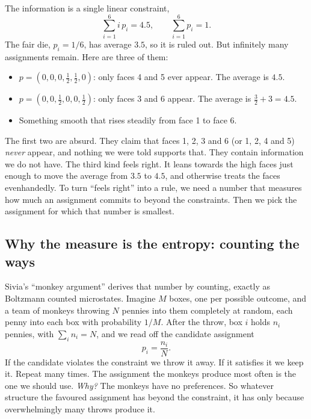 The information is a single linear constraint,
\begin{equation}
  \sum_{i=1}^{6} i\,p_i = 4.5 ,\qquad \sum_{i=1}^{6}p_i=1 .
  \label{2b:eq:die-constraint}
\end{equation}
The fair die, $p_i=1/6$, has average $3.5$, so it is ruled out. But infinitely many assignments remain. Here are three of them:
\begin{itemize}
  \item $p=(0,0,0,\tfrac12,\tfrac12,0)$: only faces 4 and 5 ever appear. The average is $4.5$.
  \item $p=(0,0,\tfrac12,0,0,\tfrac12)$: only faces 3 and 6 appear. The average is $\tfrac32+3=4.5$.
  \item Something smooth that rises steadily from face 1 to face 6.
\end{itemize}
The first two are absurd. They claim that faces 1, 2, 3 and 6 (or 1, 2, 4 and 5) \emph{never} appear, and nothing we were told supports that. They contain information we do not have. The third kind feels right. It leans towards the high faces just enough to move the average from $3.5$ to $4.5$, and otherwise treats the faces evenhandedly. To turn ``feels right'' into a rule, we need a number that measures how much an assignment commits to beyond the constraints. Then we pick the assignment for which that number is smallest.

\subsection{Why the measure is the entropy: counting the ways}
\label{2b:sec:monkeys}

Sivia's ``monkey argument''  derives that number by counting, exactly as Boltzmann counted microstates. Imagine $M$ boxes, one per possible outcome, and a team of monkeys throwing $N$ pennies into them completely at random, each penny into each box with probability $1/M$. After the throw, box $i$ holds $n_i$ pennies, with $\sum_i n_i=N$, and we read off the candidate assignment
\begin{equation}
  p_i=\frac{n_i}{N}.
  \label{2b:eq:monkey-p}
\end{equation}
If the candidate violates the constraint we throw it away. If it satisfies it we keep it. Repeat many times. The assignment the monkeys produce most often is the one we should use. \emph{Why?} The monkeys have no preferences. So whatever structure the favoured assignment has beyond the constraint, it has only because overwhelmingly many throws produce it.

